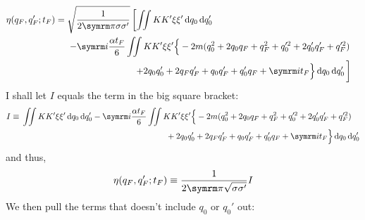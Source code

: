 \begin{align}
    \eta(q_F, q_F'; t_F) &= \begin{multlined}[t]
        \sqrt{\frac{1}{2\cpi\sigma\sigma'}}\left[\iint KK'\xi\xi'\dd{q_0}\dd{q_0'} \right.\\ \left.
        - \im\frac{\alpha t_F}{6}\iint KK'\xi\xi'\Big\{-2m(q_0^2 + 2q_0q_F + q_F^2 + q_0'^2 + 2q_0'q_F' + q_F'^2) \right.\\ \left.
        + 2q_0q_0' + 2q_Fq_F' + q_0q_F' + q_0'q_F + \im t_F\Big\}\dd{q_0}\dd{q_0'}  \vphantom{\iint}\right]
    \end{multlined}
\end{align}
I shall let $I$ equals the term in the big square bracket:
\begin{equation}
    I \equiv \begin{multlined}[t]
        \iint KK'\xi\xi'\dd{q_0}\dd{q_0'}
        - \im\frac{\alpha t_F}{6}\iint KK'\xi\xi'\Big\{-2m(q_0^2 + 2q_0q_F + q_F^2 + q_0'^2 + 2q_0'q_F' + q_F'^2) \\
        + 2q_0q_0' + 2q_Fq_F' + q_0q_F' + q_0'q_F + \im t_F\Big\}\dd{q_0}\dd{q_0'}
    \end{multlined}
\end{equation}
and thus,
\begin{equation}
    \eta(q_F, q_F'; t_F) \equiv \frac{1}{2\cpi\sqrt{\sigma\sigma'}}I 
\end{equation}
We then pull the terms that doesn't include $q_0$ or $q_0'$ out:
